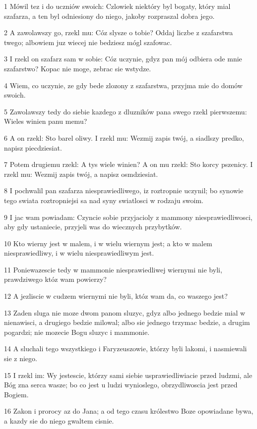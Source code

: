 \par 1 Mówil tez i do uczniów swoich: Czlowiek niektóry byl bogaty, który mial szafarza, a ten byl odniesiony do niego, jakoby rozpraszal dobra jego.
\par 2 A zawolawszy go, rzekl mu: Cóz slysze o tobie? Oddaj liczbe z szafarstwa twego; albowiem juz wiecej nie bedziesz mógl szafowac.
\par 3 I rzekl on szafarz sam w sobie: Cóz uczynie, gdyz pan mój odbiera ode mnie szafarstwo? Kopac nie moge, zebrac sie wstydze.
\par 4 Wiem, co uczynie, ze gdy bede zlozony z szafarstwa, przyjma mie do domów swoich.
\par 5 Zawolawszy tedy do siebie kazdego z dluzników pana swego rzekl pierwszemu: Wieles winien panu memu?
\par 6 A on rzekl: Sto barel oliwy. I rzekl mu: Wezmij zapis twój, a siadlszy predko, napisz piecdziesiat.
\par 7 Potem drugiemu rzekl: A tys wiele winien? A on mu rzekl: Sto korcy pszenicy. I rzekl mu: Wezmij zapis twój, a napisz osmdziesiat.
\par 8 I pochwalil pan szafarza niesprawiedliwego, iz roztropnie uczynil; bo synowie tego swiata roztropniejsi sa nad syny swiatlosci w rodzaju swoim.
\par 9 I jac wam powiadam: Czyncie sobie przyjacioly z mammony niesprawiedliwosci, aby gdy ustaniecie, przyjeli was do wiecznych przybytków.
\par 10 Kto wierny jest w malem, i w wielu wiernym jest; a kto w malem niesprawiedliwy, i w wielu niesprawiedliwym jest.
\par 11 Poniewazescie tedy w mammonie niesprawiedliwej wiernymi nie byli, prawdziwego któz wam powierzy?
\par 12 A jezliscie w cudzem wiernymi nie byli, któz wam da, co waszego jest?
\par 13 Zaden sluga nie moze dwom panom sluzyc, gdyz albo jednego bedzie mial w nienawisci, a drugiego bedzie milowal; albo sie jednego trzymac bedzie, a drugim pogardzi; nie mozecie Bogu sluzyc i mammonie.
\par 14 A sluchali tego wszystkiego i Faryzeuszowie, którzy byli lakomi, i nasmiewali sie z niego.
\par 15 I rzekl im: Wy jestescie, którzy sami siebie usprawiedliwiacie przed ludzmi, ale Bóg zna serca wasze; bo co jest u ludzi wynioslego, obrzydliwoscia jest przed Bogiem.
\par 16 Zakon i prorocy az do Jana; a od tego czasu królestwo Boze opowiadane bywa, a kazdy sie do niego gwaltem cisnie.
